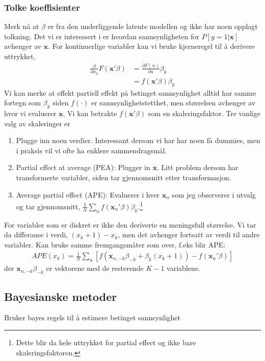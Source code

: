 \subsubsection{Tolke koeffisienter}
Merk nå at $\beta$ er fra den underliggende latente modellen og ikke har noen opplagt tolkning. Det vi er interessert i er hvordan sannsynligheten for $P[y=1|\mathbf{x}]$ avhenger av $\mathbf{x}$. For kontinuerlige variabler kan vi bruke kjerneregel til å derivere uttrykket,
\begin{align}
\frac{\partial}{\partial x_k} F(\mathbf{x}'\beta) &= \frac{\partial F(u)}{\partial u} \beta_k \\
&= f(\mathbf{x}'\beta) \beta_k
\end{align}
Vi kan merke at effekt partiell effekt på betinget sannsynlighet alltid har samme fortegn som $\beta_k$ siden $f(\cdot)$ er sannsynlighetstetthet, men størrelsen avhenger av hvor vi evaluerer $\mathbf{x}$. Vi kan betrakte $f(\mathbf{x}'\beta)$ som en skaleringsfaktor. Tre vanlige valg av skaleringer er
\begin{enumerate}
\item Plugge inn noen verdier. Interessant dersom vi har har noen få dummies, men i praksis vil vi ofte ha enklere sammendragsmål.
\item Partial effect at average (PEA): Plugger in $\bar{\mathbf{x}}$. Litt problem dersom har transformerte variabler, siden tar gjennomsnitt etter transformasjon.
\item Average partial effect (APE): Evaluerer i hver $\mathbf{x}_n$ som jeg observerer i utvalg og tar gjennomsnitt, $\frac{1}{N}\sum_n f(\mathbf{x}_n'\beta)\beta_k$.\footnote{Dette blir da hele uttrykket for partial effect og ikke bare skaleringsfaktoren.}
\end{enumerate}
For variabler som er diskret er ikke den deriverte en meningsfull størrelse. Vi tar da differanse i verdi, $(x_k+1)-x_k$, men det avhenger fortsatt av verdi til andre variabler. Kan bruke samme fremgangsmåter som over, f.eks blir APE:
\begin{align}
APE(x_k) = \frac{1}{N}\sum_n\left[f(\mathbf{x}_{n,-k}\beta_{-k}+\beta_k(x_k+1))-f(\mathbf{x}_n'\beta)\right]
\end{align}
der $\mathbf{x}_{n,-k}\beta_{-k}$ er vektorene med de resterende $K-1$ variablene.
\subsection{Bayesianske metoder}
Bruker bayes regels til å estimere betinget sannsynlighet
